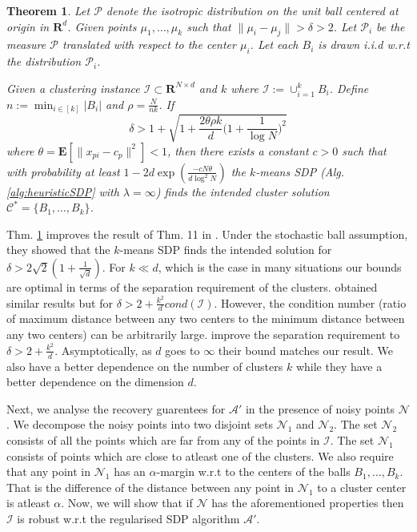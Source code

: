 \documentclass[12pt]{article}
\newcommand{\mc}{\mathcal}
\newcommand{\mb}{\mathbf}
\newtheorem{theorem}{Theorem}
\begin{document}
\begin{theorem}
\label{thm:SDPGeneral}
Let $\mc P$ denote the isotropic distribution on the unit ball centered at origin in $\mb R^d$. Given points $\mu_1, \ldots, \mu_k$ such that $\|\mu_i - \mu_j\| > \delta  > 2$. Let $\mc P_i$ be the measure $\mc P$ translated with respect to the center $\mu_i$. Let each $B_i$ is drawn i.i.d w.r.t the distribution $\mc P_i$. 

Given a clustering instance $\mc I \subset \mb R^{N\times d}$ and $k$ where $\mc I := \cup_{i=1}^k B_i$. Define $ n := \min_{i\in[k]} |B_i|$ and $\rho = \frac{N}{nk}$. If
$$\delta > 1 + \sqrt{1+\frac{2\theta\rho k}{d}\Big(1+\frac{1}{\log N}\Big)^2}$$  
where $\theta = \mb E[\|x_{pi}-c_p\|^2] < 1$, then there exists a constant $c > 0$ such that with probability at least $1 - 2d\exp(\frac{-cN\theta}{d\log^2N})$ the $k$-means SDP (Alg. \ref{alg:heuristicSDP} with $\lambda = \infty$) finds the intended cluster solution  $\mc C^* = \{B_1, \ldots, B_k\}$.
\end{theorem}

Thm. \ref{thm:SDPGeneral} improves the result of Thm. 11 in \cite{awasthi2015relax}. Under the stochastic ball assumption, they showed that the $k$-means SDP finds the intended solution for $\delta > 2\sqrt{2}(1+\frac{1}{\sqrt{d}})$. For $k \ll d$, which is the case in many situations our bounds are optimal in terms of the separation requirement of the clusters.  \cite{iguchi2015tightness} obtained similar results but for $\delta > 2 + \frac{k^2}{d}cond(\mc I)$. However, the condition number (ratio of maximum distance between any two centers to the minimum distance between any two centers) can be arbitrarily large. \cite{iguchi2017probably} improve the separation requirement to $\delta > 2 + \frac{k^2}{d}$. Asymptotically, as $d$ goes to $\infty$ their bound matches our result. We also have a better dependence on the number of clusters $k$ while they have a better dependence on the dimension $d$. 

Next, we analyse the recovery guarentees for $\mc A'$ in the presence of noisy points $\mc N$. We decompose the noisy points into two disjoint sets $\mc N_1$ and $\mc N_2$. The set $\mc N_2$ consists of all the points which are far from any of the points in $\mc I$. The set $\mc N_1$ consists of points which are close to atleast one of the clusters. We also require that any point in $\mc N_1$ has an $\alpha$-margin w.r.t to the centers of the balls $B_1, \ldots, B_k$. That is the difference of the distance between any point in $\mc N_1$ to a cluster center is atleast $\alpha$. Now, we will show that if $\mc N$ has the aforementioned properties then $\mc I$ is robust w.r.t the regularised SDP algorithm $\mc A'$.
\end{document}
